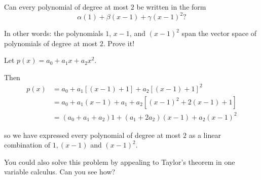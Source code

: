 \documentclass{ximera}
\begin{document}

\begin{question}
  Can every polynomial of degree at most $2$ be written in the form
  $$
  \alpha (1) + \beta (x-1) + \gamma (x-1)^2 ?
  $$
  \begin{solution}
    \begin{multiple-choice}
    \end{multiple-choice}
  \end{solution}

  In other words: the polynomials $1$, $x-1$, and $(x-1)^2$  span the vector space of polynomials of degree at most $2$. Prove it!

  \begin{free-response}
    Let $p(x)=a_0+a_1x+a_2x^2$. 
    
    Then \begin{align*}
      p(x) &= a_0+a_1[(x-1)+1]+a_2[(x-1)+1]^2\\
      &= a_0+a_1(x-1)+a_1+a_2[(x-1)^2+2(x-1)+1]\\
      &= (a_0+a_1+a_2)1+(a_1+2a_2)(x-1)+a_2(x-1)^2
    \end{align*}
    
    so we have expressed every polynomial of degree at most $2$ as a linear combination of $1,(x-1)$ and $(x-1)^2$.
    
    You could also solve this problem by appealing to Taylor's theorem in one variable calculus.  Can you see how?
\end{free-response}
\end{question}
 
\end{document}
